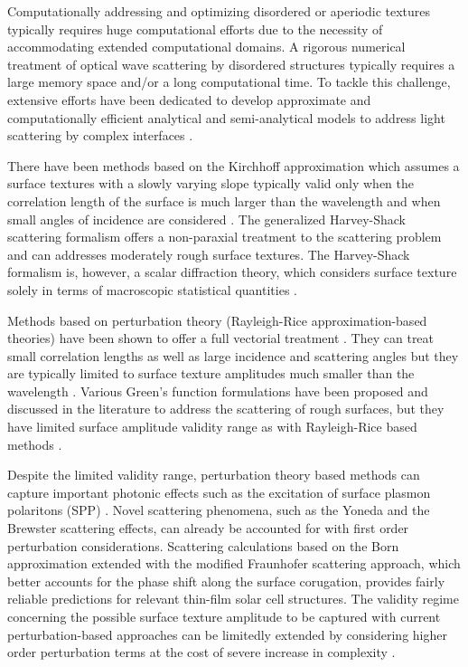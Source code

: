 \documentclass[ floatfix,reprint,amsmath,amssymb,aps,prb]{revtex4-1}
\begin{document}
Computationally addressing and optimizing disordered or aperiodic textures typically requires huge computational efforts due to the necessity of accommodating extended computational domains. A rigorous numerical treatment of optical wave scattering by disordered structures typically requires a large memory space and/or a long computational time. To tackle this challenge, extensive efforts have been dedicated to develop approximate and computationally efficient analytical and semi-analytical models to address light scattering by complex interfaces \cite{Elfouhaily:2004,Schroder:11,Gonzalez-Alcalde:16}. 

There have been methods based on the Kirchhoff approximation which assumes a surface textures with a slowly varying slope typically valid only when the
correlation length of the surface is much larger than the
wavelength and when small angles of incidence are considered \cite{Thorsos:1988,WangKirchoff:2005}. The generalized Harvey-Shack scattering formalism offers a non-paraxial treatment to the scattering problem and can addresses moderately rough surface textures. The Harvey-Shack formalism is, however, a scalar diffraction theory, which considers surface texture solely in terms of macroscopic statistical quantities \cite{Schroder:11,Krywonos:11}. 

Methods based on perturbation theory (Rayleigh-Rice approximation-based theories) have been shown to offer a full vectorial treatment \cite{Rice:1951,Saillard:2001,Soubret2001}. They can treat small correlation lengths as well as large incidence and scattering angles but they are typically limited to surface texture amplitudes much smaller than the wavelength \cite{Elfouhaily:2004}. Various Green's function formulations have been proposed and discussed in the literature to address the scattering of rough surfaces, but they have limited surface amplitude validity range as with Rayleigh-Rice based methods  \cite{Sipe:87,Paddon1998,Guerin:04,Rottenberg:2011}. 

Despite the limited validity range, perturbation theory based methods can capture important photonic effects such as the excitation of surface plasmon polaritons (SPP) \cite{Rottenberg:2011,Reitich:13}. Novel scattering phenomena, such as the Yoneda and the Brewster scattering effects, can already be accounted for with first order perturbation considerations\cite{Banon2010}. Scattering calculations based on the Born approximation extended with the modified  Fraunhofer scattering approach, which better accounts for the phase shift along the surface corugation, provides fairly reliable predictions for relevant thin-film solar cell structures\cite{Jager2009,Domine2010}. The validity regime concerning the possible surface texture amplitude to be captured with current perturbation-based approaches can be limitedly extended by considering higher order perturbation terms at the cost of severe increase in complexity \cite{Soubret2001,Demir2003,Guerin:04,Demir2012,Nicholls:15}.    
\end{document}
